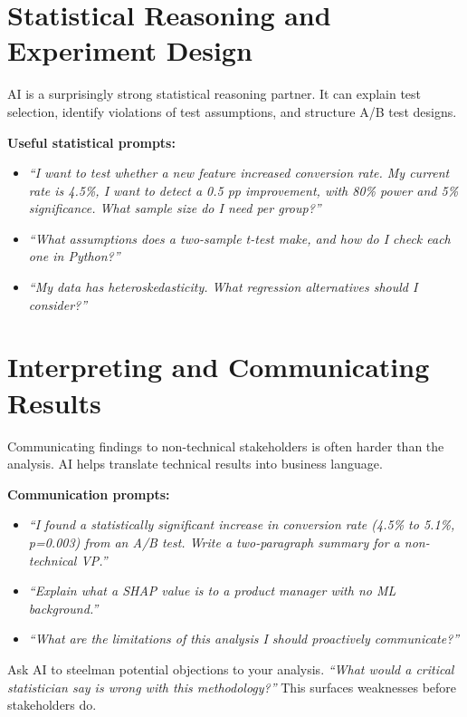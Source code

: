 \section{Statistical Reasoning and Experiment Design}
\label{sec:stats}

AI is a surprisingly strong statistical reasoning partner.
It can explain test selection, identify violations of test assumptions, and structure
A/B test designs.

\textbf{Useful statistical prompts:}
\begin{itemize}
  \item \textit{``I want to test whether a new feature increased conversion rate. My current rate is 4.5\%, I want to detect a 0.5 pp improvement, with 80\% power and 5\% significance. What sample size do I need per group?''}
  \item \textit{``What assumptions does a two-sample t-test make, and how do I check each one in Python?''}
  \item \textit{``My data has heteroskedasticity. What regression alternatives should I consider?''}
\end{itemize}

\section{Interpreting and Communicating Results}
\label{sec:interpret}

Communicating findings to non-technical stakeholders is often harder than the analysis.
AI helps translate technical results into business language.

\textbf{Communication prompts:}
\begin{itemize}
  \item \textit{``I found a statistically significant increase in conversion rate (4.5\% to 5.1\%, p=0.003) from an A/B test. Write a two-paragraph summary for a non-technical VP.''}
  \item \textit{``Explain what a SHAP value is to a product manager with no ML background.''}
  \item \textit{``What are the limitations of this analysis I should proactively communicate?''}
\end{itemize}

\begin{tipbox}
Ask AI to steelman potential objections to your analysis.
\textit{``What would a critical statistician say is wrong with this methodology?''}
This surfaces weaknesses before stakeholders do.
\end{tipbox}
